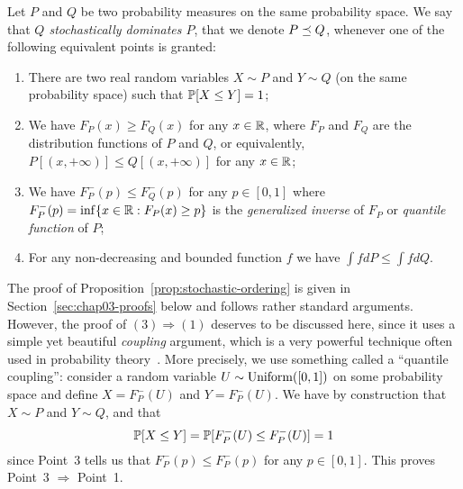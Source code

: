 \begin{proposition}
	\label{prop:stochastic-ordering}
	Let $P$ and $Q$ be two probability measures on the same probability space. We say that \emph{$Q$ stochastically dominates $P$}, that we denote $P \lest Q$, whenever one of the following equivalent points is granted:
	\begin{enumerate}
		\item There are two real random variables $X \sim P$ and $Y \sim Q$ (on the same probability space) such that $\P[X \leq Y] = 1$;
		\item We have $F_P(x) \geq F_Q(x)$ for any $x \in \R$, where $F_P$ and $F_Q$ are the distribution functions of $P$ and $Q$, or equivalently, $P[(x, +\infty)] \leq Q[(x, +\infty)]$ for any $x \in \R$;%
		\marginnote[*-3]{We recall that the distribution function of $P$ is 
		$F_P(x) = P[ (-\infty, x]]$.}%
		\item We have $F_P^-(p) \leq F_Q^-(p)$ for any $p \in [0, 1]$ where $F_P^-(p) = \inf \{ x \in \R : F_P(x) \geq p \}$ is the \emph{generalized inverse} of $F_P$ or \emph{quantile function} of $P$;%
		\item For any non-decreasing and bounded function $f$ we have $\int f dP \leq \int f dQ$.
	\end{enumerate}
\end{proposition}
The proof of Proposition~\ref{prop:stochastic-ordering} is given in Section~\ref{sec:chap03-proofs} below and follows rather standard arguments.
However, the proof of $(3) \Rightarrow (1)$ deserves to be discussed here, since it uses a simple yet beautiful \emph{coupling} argument, which is a very powerful technique often used in probability theory~.
More precisely, we use something called a ``quantile coupling'': consider a random variable $U \sim \uni([0, 1])$%
%
on some probability space and define $X = F_P^-(U)$ and $Y = F_P^-(U)$.
We have by construction%
% 
that $X \sim P$ and $Y \sim Q$, and that
\begin{equation*}
	\P[X \leq Y] = \P[F_P^-(U) \leq F_P^-(U)] = 1
\end{equation*}
since Point~3 tells us that $F_P^-(p) \leq F_P^-(p)$ for any $p \in [0, 1]$. This proves Point~3 $\Rightarrow$ Point~1.


